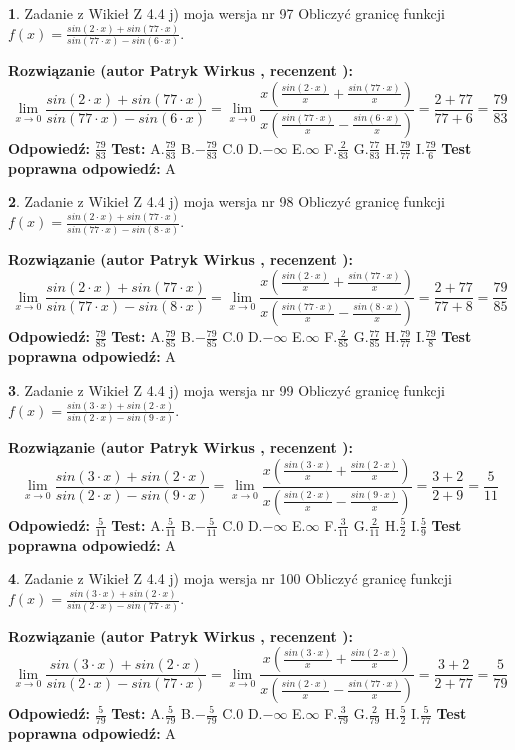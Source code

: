 \documentclass[12pt, a4paper]{article}
\theoremstyle{definition} %
\newtheorem{zad}{}
\newcommand{\zadStart}[1]{\begin{zad}#1\newline}
\newcommand{\zadStop}{\end{zad}}
\newcommand{\rozwStart}[2]{\noindent \textbf{Rozwiązanie (autor #1 , recenzent #2): }\newline}
\newcommand{\rozwStop}{\newline}
\newcommand{\odpStart}{\noindent \textbf{Odpowiedź:}\newline}
\newcommand{\odpStop}{\newline}
\newcommand{\testStart}{\noindent \textbf{Test:}\newline}
\newcommand{\testStop}{\newline}
\newcommand{\kluczStart}{\noindent \textbf{Test poprawna odpowiedź:}\newline}
\newcommand{\kluczStop}{\newline}
\begin{document}
\zadStart{Zadanie z Wikieł Z 4.4 j) moja wersja nr 97}
Obliczyć granicę funkcji $f(x)=\frac{sin(2\cdot x) +sin(77\cdot x)}{sin(77\cdot x) -sin(6\cdot x)}$.
\zadStop
\rozwStart{Patryk Wirkus}{}
$$\lim\limits_{x\to 0}\frac{sin(2\cdot x) +sin(77\cdot x)}{sin(77\cdot x) -sin(6\cdot x)}=\lim\limits_{x\to 0}\frac{x(\frac{sin(2\cdot x)}{x}+\frac{sin(77\cdot x)}{x})}{x(\frac{sin(77\cdot x)}{x}-\frac{sin(6\cdot x)}{x})}=\frac{2+77}{77+6} = \frac{79}{83}$$
\rozwStop
\odpStart
$\frac{79}{83}$
\odpStop
\testStart
A.$\frac{79}{83}$
B.$-\frac{79}{83}$
C.$0$
D.$-\infty$
E.$\infty$
F.$\frac{2}{83}$
G.$\frac{77}{83}$
H.$\frac{79}{77}$
I.$\frac{79}{6}$
\testStop
\kluczStart
A
\kluczStop



\zadStart{Zadanie z Wikieł Z 4.4 j) moja wersja nr 98}
Obliczyć granicę funkcji $f(x)=\frac{sin(2\cdot x) +sin(77\cdot x)}{sin(77\cdot x) -sin(8\cdot x)}$.
\zadStop
\rozwStart{Patryk Wirkus}{}
$$\lim\limits_{x\to 0}\frac{sin(2\cdot x) +sin(77\cdot x)}{sin(77\cdot x) -sin(8\cdot x)}=\lim\limits_{x\to 0}\frac{x(\frac{sin(2\cdot x)}{x}+\frac{sin(77\cdot x)}{x})}{x(\frac{sin(77\cdot x)}{x}-\frac{sin(8\cdot x)}{x})}=\frac{2+77}{77+8} = \frac{79}{85}$$
\rozwStop
\odpStart
$\frac{79}{85}$
\odpStop
\testStart
A.$\frac{79}{85}$
B.$-\frac{79}{85}$
C.$0$
D.$-\infty$
E.$\infty$
F.$\frac{2}{85}$
G.$\frac{77}{85}$
H.$\frac{79}{77}$
I.$\frac{79}{8}$
\testStop
\kluczStart
A
\kluczStop



\zadStart{Zadanie z Wikieł Z 4.4 j) moja wersja nr 99}
Obliczyć granicę funkcji $f(x)=\frac{sin(3\cdot x) +sin(2\cdot x)}{sin(2\cdot x) -sin(9\cdot x)}$.
\zadStop
\rozwStart{Patryk Wirkus}{}
$$\lim\limits_{x\to 0}\frac{sin(3\cdot x) +sin(2\cdot x)}{sin(2\cdot x) -sin(9\cdot x)}=\lim\limits_{x\to 0}\frac{x(\frac{sin(3\cdot x)}{x}+\frac{sin(2\cdot x)}{x})}{x(\frac{sin(2\cdot x)}{x}-\frac{sin(9\cdot x)}{x})}=\frac{3+2}{2+9} = \frac{5}{11}$$
\rozwStop
\odpStart
$\frac{5}{11}$
\odpStop
\testStart
A.$\frac{5}{11}$
B.$-\frac{5}{11}$
C.$0$
D.$-\infty$
E.$\infty$
F.$\frac{3}{11}$
G.$\frac{2}{11}$
H.$\frac{5}{2}$
I.$\frac{5}{9}$
\testStop
\kluczStart
A
\kluczStop



\zadStart{Zadanie z Wikieł Z 4.4 j) moja wersja nr 100}
Obliczyć granicę funkcji $f(x)=\frac{sin(3\cdot x) +sin(2\cdot x)}{sin(2\cdot x) -sin(77\cdot x)}$.
\zadStop
\rozwStart{Patryk Wirkus}{}
$$\lim\limits_{x\to 0}\frac{sin(3\cdot x) +sin(2\cdot x)}{sin(2\cdot x) -sin(77\cdot x)}=\lim\limits_{x\to 0}\frac{x(\frac{sin(3\cdot x)}{x}+\frac{sin(2\cdot x)}{x})}{x(\frac{sin(2\cdot x)}{x}-\frac{sin(77\cdot x)}{x})}=\frac{3+2}{2+77} = \frac{5}{79}$$
\rozwStop
\odpStart
$\frac{5}{79}$
\odpStop
\testStart
A.$\frac{5}{79}$
B.$-\frac{5}{79}$
C.$0$
D.$-\infty$
E.$\infty$
F.$\frac{3}{79}$
G.$\frac{2}{79}$
H.$\frac{5}{2}$
I.$\frac{5}{77}$
\testStop
\kluczStart
A
\kluczStop
\end{document}
